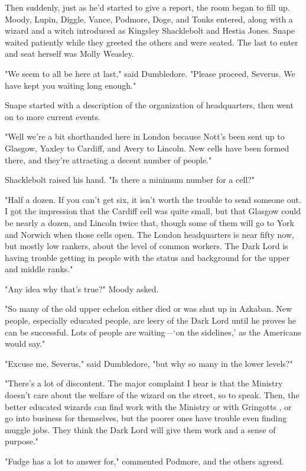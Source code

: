 Then suddenly, just as he'd started to give a report, the room began to fill up. Moody, Lupin, Diggle, Vance, Podmore, Doge, and Tonks entered, along with a wizard and a witch introduced as Kingsley Shacklebolt and Hestia Jones. Snape waited patiently while they greeted the others and were seated. The last to enter and seat herself was Molly Weasley.

"We seem to all be here at last," said Dumbledore. "Please proceed, Severus. We have kept you waiting long enough."

Snape started with a description of the organization of headquarters, then went on to more current events.

"Well{\el} we're a bit shorthanded here in{\el} London because Nott's been sent up to Glasgow, Yaxley to Cardiff, and Avery to Lincoln. New cells have been formed there, and they're attracting a decent number of people."

Shacklebolt raised his hand. "Is there a minimum number for a cell?"

"Half a dozen. If you can't get six, it isn't worth the trouble to send someone out. I got the impression that the Cardiff cell was quite small, but that Glasgow could be nearly a dozen, and Lincoln twice that, though some of them will go to York and Norwich when those cells open. The London headquarters is near fifty now, but mostly low rankers, about the level of common workers. The Dark Lord is having trouble getting in people with the status and background for the upper and middle ranks."

"Any idea why that's true?" Moody asked.

"So many of the old upper echelon either died or was shut up in Azkaban. New people, especially educated people, are leery of the Dark Lord until he proves he can be successful. Lots of people are waiting—`on the sidelines,' as the Americans would say."

"Excuse me, Severus," said Dumbledore, "but why so many in the lower levels?"

"There's a lot of discontent. The major complaint I hear is that the Ministry doesn't care about the welfare of the wizard on the street, so to speak. Then, the better educated wizards can find work with the Ministry or with Gringotts , or go into business for themselves, but the poorer ones have trouble even finding muggle jobs. They think the Dark Lord will give them work and a sense of purpose."

"Fudge has a lot to answer for," commented Podmore, and the others agreed.

